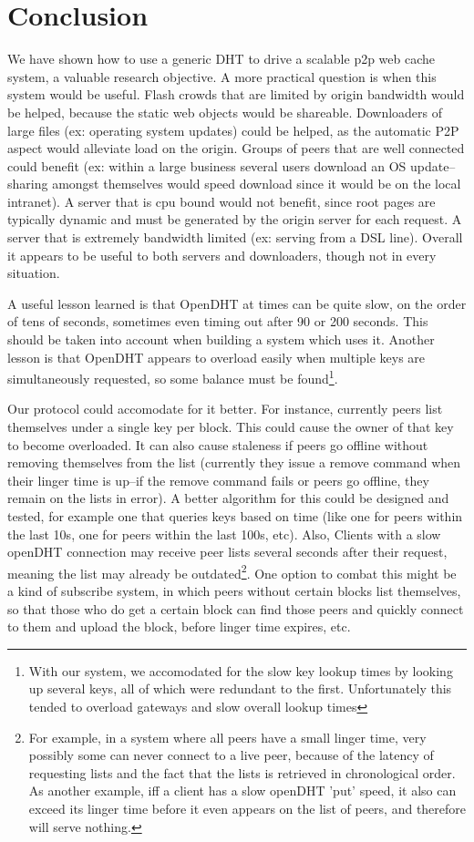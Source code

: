 
\section{Conclusion}
We have shown how to use a generic DHT to drive a scalable p2p web cache system, a valuable research objective.  A more practical question is when this system would be useful.  Flash crowds that are limited by origin bandwidth would be helped, because the static web objects would be shareable.  Downloaders of large files (ex: operating system updates) could be helped, as the automatic P2P aspect would alleviate load on the origin.  Groups of peers that are well connected could benefit (ex: within a large business several users download an OS update--sharing amongst themselves would speed download since it would be on the local intranet).  A server that is cpu bound would not benefit, since root pages are typically dynamic and must be generated by the origin server for each request.  A server that is extremely bandwidth limited (ex: serving from a DSL line).  Overall it appears to be useful to both servers and downloaders, though not in every situation.

A useful lesson learned is that OpenDHT at times can be quite slow, on the order of tens of seconds, sometimes even timing out after 90 or 200 seconds.  This should be taken into account when building a system which uses it.  Another lesson is that OpenDHT appears to overload easily when multiple keys are simultaneously requested, so some balance must be found\footnote{With our system, we accomodated for the slow key lookup times by looking up several keys, all of which were redundant to the first.  Unfortunately this tended to overload gateways and slow overall lookup times}.

Our protocol could accomodate for it better.  For instance, currently peers list themselves under a single key per block.  This could cause the owner of that key to become overloaded.  It can also cause staleness if peers go offline without removing themselves from the list (currently they issue a remove command when their linger time is up--if the remove command fails or peers go offline, they remain on the lists in error).  A better algorithm for this could be designed and tested, for example one that queries keys based on time (like one for peers within the last 10s, one for peers within the last 100s, etc).  Also, Clients with a slow openDHT connection may receive peer lists several seconds after their request, meaning the list may already be outdated\footnote{For example, in a system where all peers have a small linger time, very possibly some can never connect to a live peer, because of the latency of requesting lists and the fact that the lists is retrieved in chronological order.  As another example, iff a client has a slow openDHT 'put' speed, it also can exceed its linger time before it even appears on the list of peers, and therefore will serve nothing.}.  One option to combat this might be a kind of subscribe system, in which peers without certain blocks list themselves, so that those who do get a certain block can find those peers and quickly connect to them and upload the block, before linger time expires, etc.

